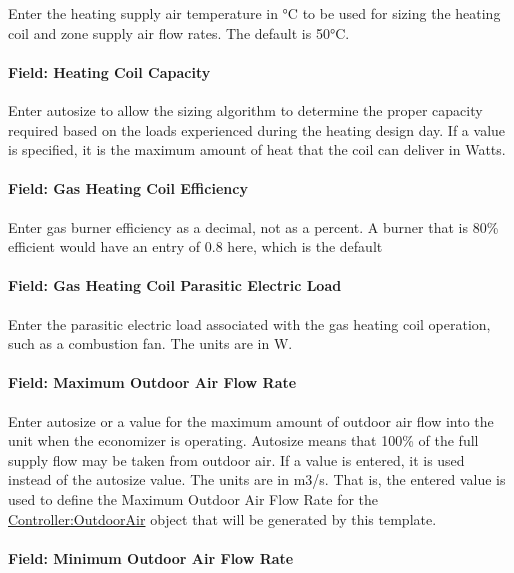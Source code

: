 Enter the heating supply air temperature in °C to be used for sizing the heating coil and zone supply air flow rates. The default is 50°C.

\paragraph{Field: Heating Coil Capacity}\label{field-heating-coil-capacity-1}

Enter autosize to allow the sizing algorithm to determine the proper capacity required based on the loads experienced during the heating design day. If a value is specified, it is the maximum amount of heat that the coil can deliver in Watts.

\paragraph{Field: Gas Heating Coil Efficiency}\label{field-gas-heating-coil-efficiency-1}

Enter gas burner efficiency as a decimal, not as a percent. A burner that is 80\% efficient would have an entry of 0.8 here, which is the default

\paragraph{Field: Gas Heating Coil Parasitic Electric Load}\label{field-gas-heating-coil-parasitic-electric-load-1}

Enter the parasitic electric load associated with the gas heating coil operation, such as a combustion fan. The units are in W.

\paragraph{Field: Maximum Outdoor Air Flow Rate}\label{field-maximum-outdoor-air-flow-rate-000}

Enter autosize or a value for the maximum amount of outdoor air flow into the unit when the economizer is operating. Autosize means that 100\% of the full supply flow may be taken from outdoor air. If a value is entered, it is used instead of the autosize value. The units are in m3/s. That is, the entered value is used to define the Maximum Outdoor Air Flow Rate for the \hyperref[controlleroutdoorair]{Controller:OutdoorAir} object that will be generated by this template.

\paragraph{Field: Minimum Outdoor Air Flow Rate}\label{field-minimum-outdoor-air-flow-rate-000}

